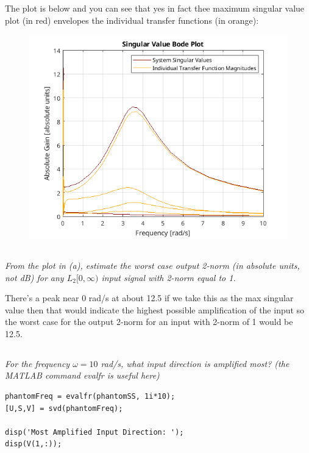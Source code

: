 \documentclass{article}
\begin{document}
The plot is below and you can see that yes in fact thee maximum singular value plot (in red) envelopes the individual transfer functions (in orange):

\begin{figure}[H]
    \centering
    \includegraphics[width=\textwidth]{singularValuePlot.png}
\end{figure}

\subsection{}

\textit{From the plot in (a), estimate the worst case output 2-norm (in absolute units, not dB) for any $L_2[0, \infty)$ input signal with 2-norm equal to 1.}

There's a peak near 0 rad/s at about 12.5 if we take this as the max singular value then that would indicate the highest possible amplification of the input so the worst case for the output 2-norm for an input with 2-norm of 1 would be 12.5.

\subsection{}

\textit{For the frequency $\omega=10$ rad/s, what input direction is amplified most? (the MATLAB command evalfr is useful here)}

\begin{lstlisting}[style=matlabstyle]
phantomFreq = evalfr(phantomSS, 1i*10);
[U,S,V] = svd(phantomFreq);

disp('Most Amplified Input Direction: ');
disp(V(1,:));
\end{lstlisting}
\end{document}
